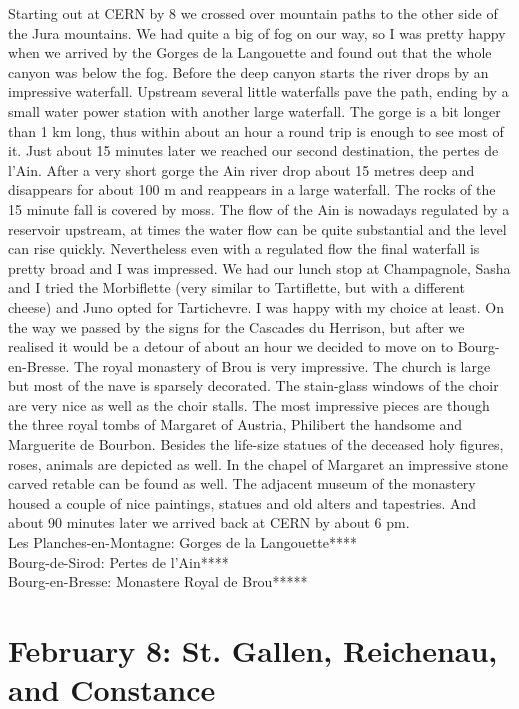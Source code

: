 Starting out at CERN by 8 we crossed over mountain paths to the other side of the Jura mountains. We had quite a big of fog on our way, so I was pretty happy when we arrived by the Gorges de la Langouette and found out that the whole canyon was below the fog. Before the deep canyon starts the river drops by an impressive waterfall. Upstream several little waterfalls pave the path, ending by a small water power station with another large waterfall. The gorge is a bit longer than 1 km long, thus within about an hour a round trip is enough to see most of it. Just about 15 minutes later we reached our second destination, the pertes de l'Ain. After a very short gorge the Ain river drop about 15 metres deep and disappears for about 100 m and reappears in a large waterfall. The rocks of the 15 minute fall is covered by moss. The flow of the Ain is nowadays regulated by a reservoir upstream, at times the water flow can be quite substantial and the level can rise quickly. Nevertheless even with a regulated flow the final waterfall is pretty broad and I was impressed. We had our lunch stop at Champagnole, Sasha and I tried the Morbiflette (very similar to Tartiflette, but with a different cheese) and Juno opted for Tartichevre. I was happy with my choice at least. On the way we passed by the signs for the Cascades du Herrison, but after we realised it would be a detour of about an hour we decided to move on to Bourg-en-Bresse. The royal monastery of Brou is very impressive. The church is large but most of the nave is sparsely decorated. The stain-glass windows of the choir are very nice as well as the choir stalls. The most impressive pieces are though the three royal tombs of Margaret of Austria, Philibert the handsome and Marguerite de Bourbon. Besides the life-size statues of the deceased holy figures, roses, animals are depicted as well. In the chapel of Margaret an impressive stone carved retable can be found as well. The adjacent museum of the monastery housed a couple of nice paintings, statues and old alters and tapestries. And about 90 minutes later we arrived back at CERN by about 6 pm.\\ 

Les Planches-en-Montagne: Gorges de la Langouette****\\
Bourg-de-Sirod: Pertes de l'Ain****\\
Bourg-en-Bresse: Monastere Royal de Brou*****\\

\section{February 8: St. Gallen, Reichenau, and Constance}
\label{2020:Reichenau}

